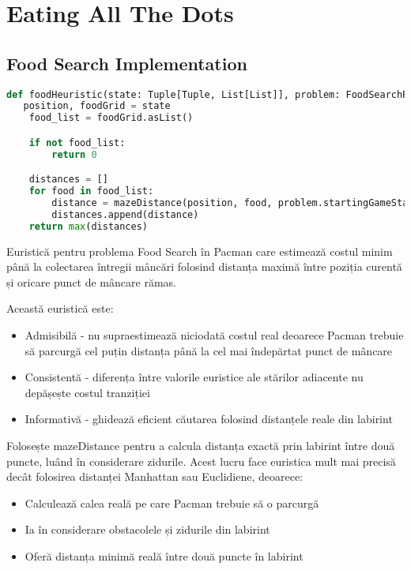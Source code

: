 \documentclass[12pt,a4paper]{article}
\begin{document}
\section{Eating All The Dots}

\subsection{Food Search Implementation}
\begin{lstlisting}[language=Python]
def foodHeuristic(state: Tuple[Tuple, List[List]], problem: FoodSearchProblem):
   position, foodGrid = state
    food_list = foodGrid.asList()

    if not food_list:
        return 0

    distances = []
    for food in food_list:
        distance = mazeDistance(position, food, problem.startingGameState)
        distances.append(distance)
    return max(distances)
\end{lstlisting}


Euristică pentru problema Food Search în Pacman care estimează costul minim până la colectarea 
întregii mâncări folosind distanța maximă între poziția curentă și oricare punct de mâncare rămas.

Această euristică este:
\begin{itemize}
    \item  Admisibilă - nu supraestimează niciodată costul real deoarece Pacman trebuie să parcurgă cel puțin distanța până la cel mai îndepărtat punct de mâncare
    \item  Consistentă - diferența între valorile euristice ale stărilor adiacente nu depășește costul tranziției
    \item  Informativă - ghidează eficient căutarea folosind distanțele reale din labirint
\end{itemize}

Folosește mazeDistance pentru a calcula distanța exactă prin labirint între două puncte, luând 
în considerare zidurile. Acest lucru face euristica mult mai precisă decât folosirea distanței 
Manhattan sau Euclidiene, deoarece:
\begin{itemize}
    \item  Calculează calea reală pe care Pacman trebuie să o parcurgă
    \item  Ia în considerare obstacolele și zidurile din labirint
    \item  Oferă distanța minimă reală între două puncte în labirint
\end{itemize}
\end{document}
